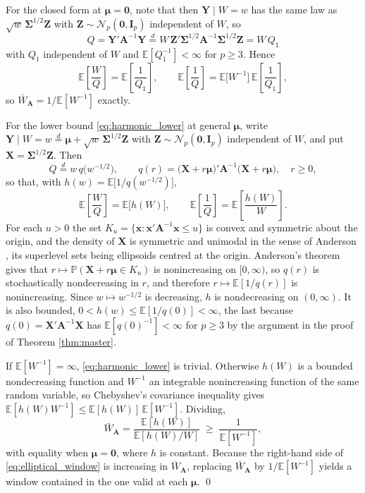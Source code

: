 \documentclass[pdflatex,sn-mathphys-num]{sn-jnl}%
\theoremstyle{thmstyleone}%
\theoremstyle{thmstyletwo}%
\theoremstyle{thmstylethree}%
\newenvironment{revblock}{}{}
\newcommand{\E}{\mathbb{E}}
\begin{document}
\begin{appendices}
For the closed form at $\bm\mu=\bm 0$, note that then $\bm Y\mid W=w$ has the same law as $\sqrt w\,\bm\Sigma^{1/2}\bm Z$ with $\bm Z\sim\mathcal N_p(\bm 0,\bm I_p)$ independent of $W$, so
\begin{equation}
Q=\bm Y'\bm A^{-1}\bm Y
\stackrel{d}{=}
W\,\bm Z'\bm\Sigma^{1/2}\bm A^{-1}\bm\Sigma^{1/2}\bm Z
=W\,Q_1
\end{equation}
with $Q_1$ independent of $W$ and $\E[Q_1^{-1}]<\infty$ for $p\ge3$. Hence
\begin{equation}
\E\left[\frac WQ\right]=\E\left[\frac{1}{Q_1}\right],
\qquad
\E\left[\frac 1Q\right]=\E\bigl[W^{-1}\bigr]\,\E\left[\frac{1}{Q_1}\right],
\end{equation}
so $\bar W_{\bm A}=1/\E[W^{-1}]$ exactly.

For the lower bound \eqref{eq:harmonic_lower} at general $\bm\mu$, write $\bm Y\mid W=w\stackrel{d}{=}\bm\mu+\sqrt w\,\bm\Sigma^{1/2}\bm Z$ with $\bm Z\sim\mathcal N_p(\bm 0,\bm I_p)$ independent of $W$, and put $\bm X=\bm\Sigma^{1/2}\bm Z$. Then
\begin{equation}
Q\stackrel{d}{=}w\,q\bigl(w^{-1/2}\bigr),
\qquad
q(r)=\bigl(\bm X+r\bm\mu\bigr)'\bm A^{-1}\bigl(\bm X+r\bm\mu\bigr),
\quad r\ge0,
\end{equation}
so that, with $h(w)=\E\bigl[1/q(w^{-1/2})\bigr]$,
\begin{equation}
\E\left[\frac{W}{Q}\right]=\E\bigl[h(W)\bigr],
\qquad
\E\left[\frac{1}{Q}\right]=\E\left[\frac{h(W)}{W}\right].
\end{equation}
For each $u>0$ the set $K_u=\{\bm x:\bm x'\bm A^{-1}\bm x\le u\}$ is convex and symmetric about the origin, and the density of $\bm X$ is symmetric and unimodal in the sense of Anderson \cite{anderson1955}, its superlevel sets being ellipsoids centred at the origin. Anderson's theorem gives that $r\mapsto\mathbb P(\bm X+r\bm\mu\in K_u)$ is nonincreasing on $[0,\infty)$, so $q(r)$ is stochastically nondecreasing in $r$, and therefore $r\mapsto\E[1/q(r)]$ is nonincreasing. Since $w\mapsto w^{-1/2}$ is decreasing, $h$ is nondecreasing on $(0,\infty)$. It is also bounded, $0<h(w)\le\E[1/q(0)]<\infty$, the last because $q(0)=\bm X'\bm A^{-1}\bm X$ has $\E[q(0)^{-1}]<\infty$ for $p\ge3$ by the argument in the proof of Theorem \ref{thm:master}.

If $\E[W^{-1}]=\infty$, \eqref{eq:harmonic_lower} is trivial. Otherwise $h(W)$ is a bounded nondecreasing function and $W^{-1}$ an integrable nonincreasing function of the same random variable, so Chebyshev's covariance inequality gives $\E[h(W)W^{-1}]\le\E[h(W)]\,\E[W^{-1}]$. Dividing,
\begin{equation}
\bar W_{\bm A}=\frac{\E[h(W)]}{\E[h(W)/W]}\;\ge\;\frac{1}{\E[W^{-1}]} ,
\end{equation}
with equality when $\bm\mu=\bm 0$, where $h$ is constant. Because the right-hand side of \eqref{eq:elliptical_window} is increasing in $\bar W_{\bm A}$, replacing $\bar W_{\bm A}$ by $1/\E[W^{-1}]$ yields a window contained in the one valid at each $\bm\mu$.
\qed


\end{appendices}
\end{document}
